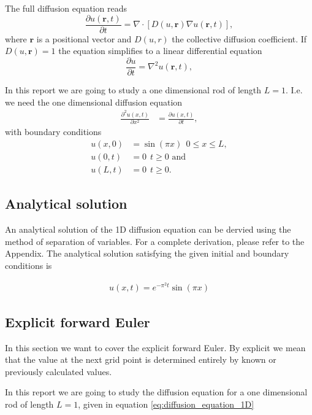 \documentclass[12pt]{extarticle}
\begin{document}
The full diffusion equation reads
\begin{equation*}
\frac{\partial u(\mathbf{r}, t)}{\partial t} = \nabla \cdot \left[D(u, \mathbf{r})\nabla u(\mathbf{r}, t)\right],
\end{equation*}
where $\mathbf{r}$ is a positional vector and $D(u,r)$ the collective diffusion coefficient. If $D(u,\mathbf{r}) = 1$ the equation simplifies to a linear differential equation
\begin{equation*}
\frac{\partial u}{\partial t} = \nabla^2u(\mathbf{r}, t),
\end{equation*}

In this report we are going to study a one dimensional rod of length $L=1$. I.e. we need the one dimensional diffusion equation
\begin{align}
\label{eq:diffusion_equation_1D}
\frac{\partial^2 u(x,t)}{\partial x^2} &= \frac{\partial u(x,t)}{\partial t},
\end{align}
with boundary conditions
\begin{align*}
u(x,0) &= \sin(\pi x) \ \ 0\leq x\leq L,\\
u(0,t) &= 0 \ \ t\geq 0 \text{ and} \\
u(L,t) &= 0 \ \ t\geq 0.
\end{align*}

\subsection{Analytical solution}


An analytical solution of the 1D diffusion equation can be dervied using the method of separation of variables.
For a complete derivation, please refer to the Appendix.
The analytical solution satisfying the given initial and boundary conditions is

\begin{align} \label{eq:analytical_solution_diffusion}
	u(x,t) = e^{-\pi^2 t} \sin(\pi x)
\end{align}

\subsection{Explicit forward Euler}
In this section we want to cover the explicit forward Euler. By explicit we mean that the value at the next grid point is determined entirely by known or previously calculated values.

In this report we are going to study the diffusion equation for a one dimensional rod of length $L=1$, given in equation \eqref{eq:diffusion_equation_1D}
\end{document}
